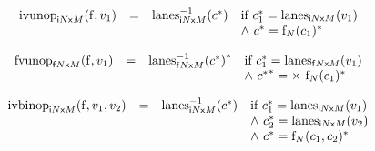 \vspace{1ex}

\vspace{1ex}

$$
\begin{array}[t]{@{}lcl@{}l@{}}
{{\mathrm{ivunop}}}_{{{\mathsf{i}}{N}}{\mathsf{x}}{M}}({\mathrm{f}}, v_1) & = & {{{{\mathrm{lanes}}}_{{{\mathsf{i}}{N}}{\mathsf{x}}{M}}^{{-1}}}}{({c^\ast})} & \quad
\begin{array}[t]{@{}l@{}}
\mbox{if}~ {c_1^\ast} = {{\mathrm{lanes}}}_{{{\mathsf{i}}{N}}{\mathsf{x}}{M}}(v_1) \\
{\land}~ {c^\ast} = {{{\mathrm{f}}}_{N}(c_1)^\ast} \\
\end{array} \\
\end{array}
$$

$$
\begin{array}[t]{@{}lcl@{}l@{}}
{{\mathrm{fvunop}}}_{{{\mathsf{f}}{N}}{\mathsf{x}}{M}}({\mathrm{f}}, v_1) & = & {{{{{\mathrm{lanes}}}_{{{\mathsf{f}}{N}}{\mathsf{x}}{M}}^{{-1}}}}{({c^\ast})}^\ast} & \quad
\begin{array}[t]{@{}l@{}}
\mbox{if}~ {c_1^\ast} = {{\mathrm{lanes}}}_{{{\mathsf{f}}{N}}{\mathsf{x}}{M}}(v_1) \\
{\land}~ {{c^\ast}^\ast} = {\Large\times}~{{{\mathrm{f}}}_{N}(c_1)^\ast} \\
\end{array} \\
\end{array}
$$

\vspace{1ex}

$$
\begin{array}[t]{@{}lcl@{}l@{}}
{{\mathrm{ivbinop}}}_{{{\mathsf{i}}{N}}{\mathsf{x}}{M}}({\mathrm{f}}, v_1, v_2) & = & {{{{\mathrm{lanes}}}_{{{\mathsf{i}}{N}}{\mathsf{x}}{M}}^{{-1}}}}{({c^\ast})} & \quad
\begin{array}[t]{@{}l@{}}
\mbox{if}~ {c_1^\ast} = {{\mathrm{lanes}}}_{{{\mathsf{i}}{N}}{\mathsf{x}}{M}}(v_1) \\
{\land}~ {c_2^\ast} = {{\mathrm{lanes}}}_{{{\mathsf{i}}{N}}{\mathsf{x}}{M}}(v_2) \\
{\land}~ {c^\ast} = {{{\mathrm{f}}}_{N}(c_1, c_2)^\ast} \\
\end{array} \\
\end{array}
$$

